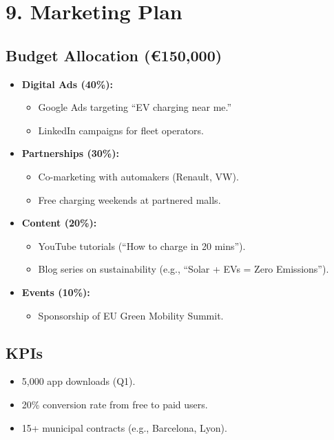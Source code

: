 \section{9. Marketing Plan}

\subsection*{Budget Allocation (€150,000)}

\begin{itemize}
    \item \textbf{Digital Ads (40\%):}
    \begin{itemize}
        \item Google Ads targeting “EV charging near me.”
        \item LinkedIn campaigns for fleet operators.
    \end{itemize}
    \item \textbf{Partnerships (30\%):}
    \begin{itemize}
        \item Co-marketing with automakers (Renault, VW).
        \item Free charging weekends at partnered malls.
    \end{itemize}
    \item \textbf{Content (20\%):}
    \begin{itemize}
        \item YouTube tutorials (“How to charge in 20 mins”).
        \item Blog series on sustainability (e.g., “Solar + EVs = Zero Emissions”).
    \end{itemize}
    \item \textbf{Events (10\%):}
    \begin{itemize}
        \item Sponsorship of EU Green Mobility Summit.
    \end{itemize}
\end{itemize}

\subsection*{KPIs}
\begin{itemize}
    \item 5,000 app downloads (Q1).
    \item 20\% conversion rate from free to paid users.
    \item 15+ municipal contracts (e.g., Barcelona, Lyon).
\end{itemize}

